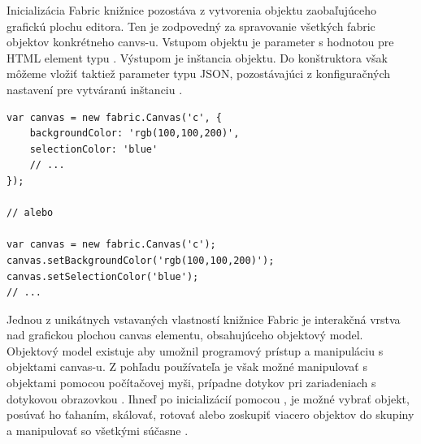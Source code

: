 Inicializácia Fabric knižnice pozostáva z vytvorenia  objektu zaobaľujúceho grafickú plochu editora. Ten je zodpovedný za spravovanie všetkých fabric objektov konkrétneho canvs-u. Vstupom objektu je parameter s hodnotou  pre HTML element typu . Výstupom je inštancia  objektu. Do konštruktora však môžeme vložiť taktiež parameter typu JSON, pozostávajúci z konfiguračných nastavení pre vytváranú inštanciu . 
\begin{lstlisting}[style=web,caption={Inicializácia Fabric canvas wrappera},captionpos=b, label={lst:fabric.init}]
var canvas = new fabric.Canvas('c', {
	backgroundColor: 'rgb(100,100,200)',
	selectionColor: 'blue'
	// ...
});

// alebo

var canvas = new fabric.Canvas('c');
canvas.setBackgroundColor('rgb(100,100,200)');
canvas.setSelectionColor('blue');
// ...
\end{lstlisting}
Jednou z unikátnych vstavaných vlastností knižnice Fabric je interakčná vrstva nad grafickou plochou canvas elementu, obsahujúceho objektový model. Objektový model existuje aby umožnil programový prístup a manipuláciu s objektami canvas-u. Z pohľadu používateľa je však možné manipulovať s objektami pomocou počítačovej myši, prípadne dotykov pri zariadeniach s dotykovou obrazovkou . Ihneď po inicializácií pomocou , je možné vybrať objekt, posúvať ho ťahaním, skálovať, rotovať alebo zoskupiť viacero objektov do skupiny a manipulovať so všetkými súčasne .  

